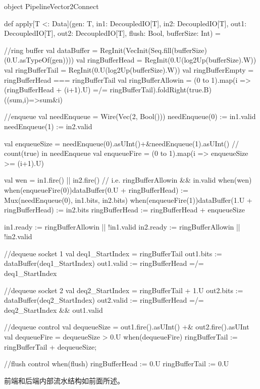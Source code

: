 \begin{CodeBlock}[language=BookScala]
object PipelineVector2Connect {
  def apply[T <: Data](gen: T, in1: DecoupledIO[T], in2: DecoupledIO[T], out1: DecoupledIO[T], out2: DecoupledIO[T], flush: Bool, bufferSize: Int) = {

    //ring buffer
    val dataBuffer = RegInit(VecInit(Seq.fill(bufferSize)(0.U.asTypeOf(gen))))
    val ringBufferHead = RegInit(0.U(log2Up(bufferSize).W))
    val ringBufferTail = RegInit(0.U(log2Up(bufferSize).W))
    val ringBufferEmpty = ringBufferHead === ringBufferTail
    val ringBufferAllowin = (0 to 1).map(i => (ringBufferHead + (i+1).U) =/= ringBufferTail).foldRight(true.B)((sum,i)=>sum&i)
    
    //enqueue
    val needEnqueue = Wire(Vec(2, Bool()))
    needEnqueue(0) := in1.valid
    needEnqueue(1) := in2.valid

    val enqueueSize = needEnqueue(0).asUInt()+&needEnqueue(1).asUInt() // count(true) in needEnqueue
    val enqueueFire = (0 to 1).map(i => enqueueSize >= (i+1).U)

    val wen = in1.fire() || in2.fire() // i.e. ringBufferAllowin && in.valid
    when(wen){
        when(enqueueFire(0)){dataBuffer(0.U + ringBufferHead) := Mux(needEnqueue(0), in1.bits, in2.bits)}
        when(enqueueFire(1)){dataBuffer(1.U + ringBufferHead) := in2.bits}
        ringBufferHead := ringBufferHead + enqueueSize
    }

    in1.ready := ringBufferAllowin || !in1.valid
    in2.ready := ringBufferAllowin || !in2.valid

    //dequeue socket 1
    val deq1_StartIndex = ringBufferTail
    out1.bits := dataBuffer(deq1_StartIndex)
    out1.valid := ringBufferHead =/= deq1_StartIndex

    //dequeue socket 2
    val deq2_StartIndex = ringBufferTail + 1.U
    out2.bits := dataBuffer(deq2_StartIndex)
    out2.valid := ringBufferHead =/= deq2_StartIndex && out1.valid

    //dequeue control
    val dequeueSize = out1.fire().asUInt() +& out2.fire().asUInt
    val dequeueFire = dequeueSize > 0.U
    when(dequeueFire){
        ringBufferTail := ringBufferTail + dequeueSize;
    }

    //flush control
    when(flush){
        ringBufferHead := 0.U
        ringBufferTail := 0.U
    }

  }
}
\end{CodeBlock}

前端和后端内部流水结构如前面所述。


